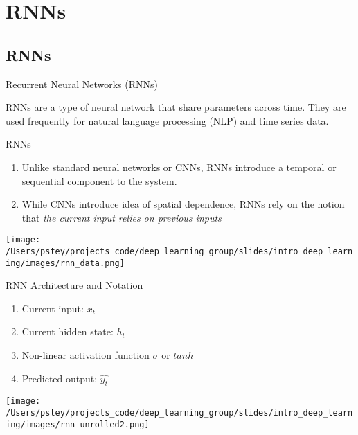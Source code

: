 \documentclass[pdf]{beamer}
\begin{document}
	
	
	
	
\section{RNNs}

\subsection{RNNs}

	\begin{frame}{Recurrent Neural Networks (RNNs)}
	
	\begin{center}
		RNNs are a type of neural network that share parameters across time. They are used frequently for natural language processing (NLP) and time series data.
	\end{center}
	\end{frame}

	\begin{frame}{RNNs}
	\begin{enumerate}
		\item Unlike standard neural networks or CNNs, RNNs introduce a temporal or sequential component to the system.
		\item While CNNs introduce idea of spatial dependence, RNNs rely on the notion that \textit{the current input relies on previous inputs} 
	\end{enumerate}
	\begin{center}
		\texttt{[image: /Users/pstey/projects\_code/deep\_learning\_group/slides/intro\_deep\_learning/images/rnn\_data.png]}
	\end{center}
	\end{frame}


	\begin{frame}{RNN Architecture and Notation}
	\begin{enumerate}
		\item Current input: $x_t$
		\item Current hidden state: $h_t$
		\item Non-linear activation function $\sigma$ or $tanh$
		\item Predicted output: $\widehat{y_t}$
	\end{enumerate}
	
	\begin{center}
		\texttt{[image: /Users/pstey/projects\_code/deep\_learning\_group/slides/intro\_deep\_learning/images/rnn\_unrolled2.png]}
	\end{center}
	\end{frame}
	
\end{document}
